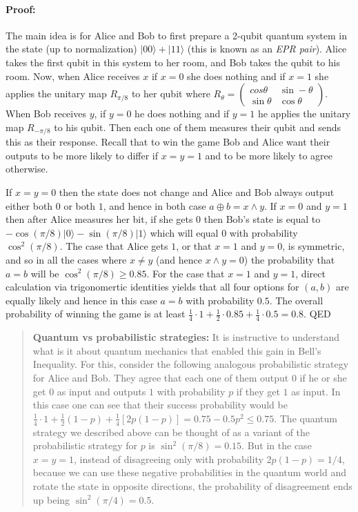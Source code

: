 \paragraph{Proof:} The main idea is for Alice and Bob to first prepare a
2-qubit quantum system in the state (up to normalization)
\(|00\rangle+|11\rangle\) (this is known as an \emph{EPR pair}). Alice
takes the first qubit in this system to her room, and Bob takes the
qubit to his room. Now, when Alice receives \(x\) if \(x=0\) she does
nothing and if \(x=1\) she applies the unitary map \(R_{\pi/8}\) to her
qubit where
\(R_\theta = \left( \begin{smallmatrix} cos \theta & \sin -\theta \\ \sin \theta & \cos \theta \end{smallmatrix} \right)\).
When Bob receives \(y\), if \(y=0\) he does nothing and if \(y=1\) he
applies the unitary map \(R_{-\pi/8}\) to his qubit. Then each one of
them measures their qubit and sends this as their response. Recall that
to win the game Bob and Alice want their outputs to be more likely to
differ if \(x=y=1\) and to be more likely to agree otherwise.

If \(x=y=0\) then the state does not change and Alice and Bob always
output either both \(0\) or both \(1\), and hence in both case
\(a\oplus b = x \wedge y\). If \(x=0\) and \(y=1\) then after Alice
measures her bit, if she gets \(0\) then Bob's state is equal to
\(-\cos (\pi/8)|0\rangle-\sin(\pi/8)|1\rangle\) which will equal \(0\)
with probability \(\cos^2 (\pi/8)\). The case that Alice gets \(1\), or
that \(x=1\) and \(y=0\), is symmetric, and so in all the cases where
\(x\neq y\) (and hence \(x \wedge y=0\)) the probability that \(a=b\)
will be \(\cos^2(\pi/8) \geq 0.85\). For the case that \(x=1\) and
\(y=1\), direct calculation via trigonomertic identities yields that all
four options for \((a,b)\) are equally likely and hence in this case
\(a=b\) with probability \(0.5\). The overall probability of winning the
game is at least
\(\tfrac{1}{4}\cdot 1 + \tfrac{1}{2}\cdot 0.85 + \tfrac{1}{4} \cdot 0.5 =0.8\).
QED

\begin{quote}
\textbf{Quantum vs probabilistic strategies:} It is instructive to
understand what is it about quantum mechanics that enabled this gain in
Bell's Inequality. For this, consider the following analogous
probabilistic strategy for Alice and Bob. They agree that each one of
them output \(0\) if he or she get \(0\) as input and outputs \(1\) with
probability \(p\) if they get \(1\) as input. In this case one can see
that their success probability would be
\(\tfrac{1}{4}\cdot 1 + \tfrac{1}{2}(1-p)+\tfrac{1}{4}[2p(1-p)]=0.75 -0.5p^2 \leq 0.75\).
The quantum strategy we described above can be thought of as a variant
of the probabilistic strategy for \(p\) is \(\sin^2 (\pi/8)=0.15\). But
in the case \(x=y=1\), instead of disagreeing only with probability
\(2p(1-p)=1/4\), because we can use these negative probabilities in the
quantum world and rotate the state in opposite directions, the
probability of disagreement ends up being \(\sin^2 (\pi/4)=0.5\).
\end{quote}

